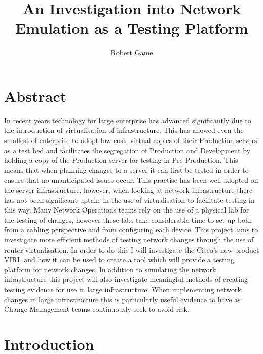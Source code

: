 \documentclass[11pt]{report}
\begin{document}
\title{An Investigation into Network Emulation as a Testing Platform}
\author{Robert Game}
\date{}
\maketitle

\chapter*{Abstract}

In recent years technology for large enterprise has advanced significantly due to the introduction of virtualisation of infrastructure. This has allowed even the smallest of enterprise to adopt low-cost, virtual copies of their Production servers as a test bed and facilitates the segregation of Production and Development by holding a copy of the Production server for testing in Pre-Production. This means that when planning changes to a server it can first be tested in order to ensure that no unanticipated issues occur. This practise has been well adopted on the server infrastructure, however, when looking at network infrastructure there has not been significant uptake in the use of virtualisation to facilitate testing in this way. Many Network Operations teams rely on the use of a physical lab for the testing of changes, however these labs take considerable time to set up both from a cabling perspective and from configuring each device. This project aims to investigate more efficient methods of testing network changes through the use of router virtualisation. In order to do this I will investigate the Cisco's new product VIRL and how it can be used to create a tool which will provide a testing platform for network changes. In addition to simulating the network infrastructure this project will also investigate meaningful methods of creating testing evidence for use in large infrastructure. When implementing network changes in large infrastructure this is particularly useful evidence to have as Change Management teams continuously seek to avoid risk.

\pagebreak

\tableofcontents

\chapter{Introduction}
\end{document}
